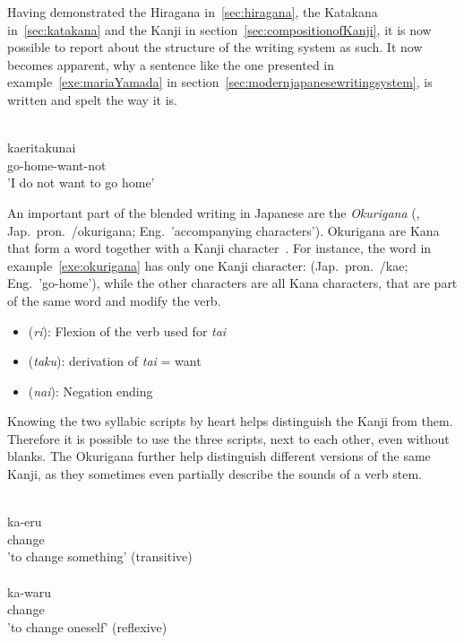 Having demonstrated the Hiragana in~\ref{sec:hiragana}, the Katakana 
in~\ref{sec:katakana} and the Kanji in section~\ref{sec:compositionofKanji}, 
it is now possible to report about the structure of the writing system as such.
It now becomes apparent, why a sentence like the one presented in 
example~\ref{exe:mariaYamada} in section~\ref{sec:modernjapanesewritingsystem},
is written and spelt the way it is.
\begin{exe}
\ex\label{exe:okurigana}
\gll 
  \\
 kaeritakunai \\
 go-home-want-not \\
\trans 'I do not want to go home' \\
\end{exe}
An important part of the blended writing in Japanese are the 
\emph{Okurigana} (, Jap.\ pron.\ /okurigana; 
Eng.\ 'accompanying characters'). Okurigana are Kana that form 
a word together with a Kanji character~.
For instance, the word in example~\ref{exe:okurigana} has only one Kanji 
character:  (Jap.\ pron.\ /kae; Eng.\ 'go-home'), while the other characters are all Kana characters, that are part of the same word and modify
the verb.
\begin{itemize}
  \item {} (\emph{ri}): Flexion of the verb used for \emph{tai}
  \item {} (\emph{taku}): derivation of \emph{tai} = want
  \item {} (\emph{nai}): Negation ending
\end{itemize}
Knowing the two syllabic scripts by heart helps distinguish the Kanji from them.
Therefore it is possible to use the three scripts, next to each other, even 
without blanks. The Okurigana further help distinguish different versions of 
the same Kanji, as they sometimes even partially describe the sounds of a 
verb stem.
\begin{exe}
\ex\label{exe:stemspelling}
\begin{xlist}
\ex\label{exe:stemspellingkaeru}
\gll 
  \\
 ka-eru \\
 change \\
\trans 'to change something' (transitive) \\

\ex\label{exe:stemspellingkawaru}
\gll 
  \\
 ka-waru \\
 change \\
\trans 'to change oneself' (reflexive) \\
\end{xlist}
\end{exe}
